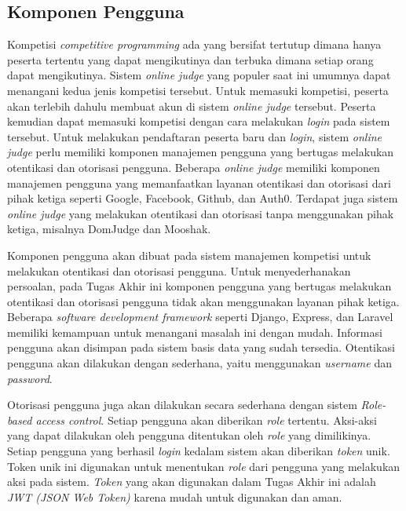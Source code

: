 \subsection{Komponen Pengguna}

\par Kompetisi \textit{competitive programming} ada yang bersifat tertutup dimana hanya peserta tertentu yang dapat mengikutinya dan terbuka dimana setiap orang dapat mengikutinya. Sistem \textit{online judge} yang populer saat ini umumnya dapat menangani kedua jenis kompetisi tersebut. Untuk memasuki kompetisi, peserta akan terlebih dahulu membuat akun di sistem \textit{online judge} tersebut. Peserta kemudian dapat memasuki kompetisi dengan cara melakukan \textit{login} pada sistem tersebut. Untuk melakukan pendaftaran peserta baru dan \textit{login}, sistem \textit{online judge} perlu memiliki komponen manajemen pengguna yang bertugas melakukan otentikasi dan otorisasi pengguna. Beberapa \textit{online judge} memiliki komponen manajemen pengguna yang memanfaatkan layanan otentikasi dan otorisasi dari pihak ketiga seperti Google, Facebook, Github, dan Auth0. Terdapat juga sistem \textit{online judge} yang melakukan otentikasi dan otorisasi tanpa menggunakan pihak ketiga, misalnya DomJudge dan Mooshak.

\par Komponen pengguna akan dibuat pada sistem manajemen kompetisi untuk melakukan otentikasi dan otorisasi pengguna. Untuk menyederhanakan persoalan, pada Tugas Akhir ini komponen pengguna yang bertugas melakukan otentikasi dan otorisasi pengguna tidak akan menggunakan layanan pihak ketiga. Beberapa \textit{software development framework} seperti Django, Express, dan Laravel memiliki kemampuan untuk menangani masalah ini dengan mudah. Informasi pengguna akan disimpan pada sistem basis data yang sudah tersedia. Otentikasi pengguna akan dilakukan dengan sederhana, yaitu menggunakan \textit{username} dan \textit{password}.

\par Otorisasi pengguna juga akan dilakukan secara sederhana dengan sistem \textit{Role-based access control}. Setiap pengguna akan diberikan \textit{role} tertentu. Aksi-aksi yang dapat dilakukan oleh pengguna ditentukan oleh \textit{role} yang dimilikinya. Setiap pengguna yang berhasil \textit{login} kedalam sistem akan diberikan \textit{token} unik. Token unik ini digunakan untuk menentukan \textit{role} dari pengguna yang melakukan aksi pada sistem. \textit{Token} yang akan digunakan dalam Tugas Akhir ini adalah \textit{JWT (JSON Web Token)} karena mudah untuk digunakan dan aman.

